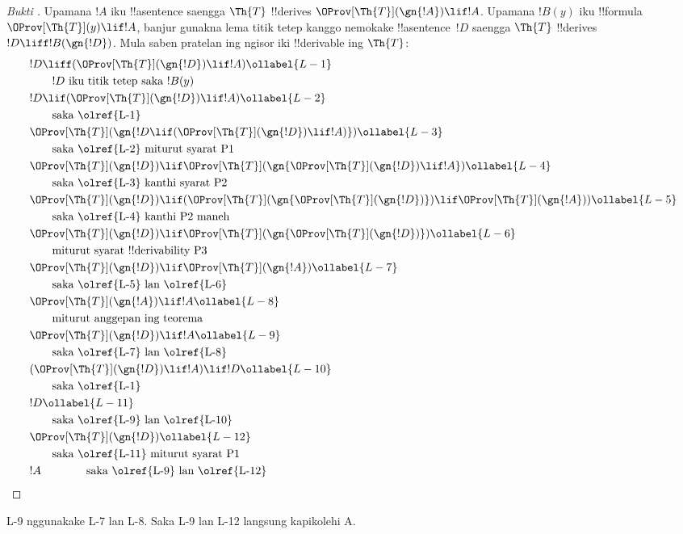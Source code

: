 \documentclass[../../../include/open-logic-section]{subfiles}
\begin{document}
\begin{proof}[Bukti ]
Upamana $!A$ iku !!a{sentence} saengga $\Th{T}$ !!{derive}s
$\OProv[\Th{T}](\gn{!A}) \lif !A$. Upamana $!B(y)$ iku
!!{formula}~$\OProv[\Th{T}](y) \lif !A$, banjur gunakna lema titik
tetep kanggo nemokake !!a{sentence}~$!D$ saengga $\Th{T}$
!!{derive}s $!D \liff !B(\gn{!D})$. Mula saben pratelan ing
ngisor iki !!{derivable} ing $\Th{T}$:
\begin{align}
  & !D \liff (\OProv[\Th{T}](\gn{!D}) \lif !A) \ollabel{L-1}\\
  & \qquad \text{$!D$ iku titik tetep saka~$!B(y)$}\notag \\
  & !D \lif (\OProv[\Th{T}](\gn{!D}) \lif !A) \ollabel{L-2}\\
  & \qquad\text{saka \olref{L-1}}\notag\\
  & \OProv[\Th{T}](\gn{!D \lif (\OProv[\Th{T}](\gn{!D}) \lif !A)}) \ollabel{L-3}\\
  & \qquad \text{saka \olref{L-2} miturut syarat P1}\notag \\
  & \OProv[\Th{T}](\gn{!D}) \lif \OProv[\Th{T}](\gn{\OProv[\Th{T}](\gn{!D}) \lif !A})
  \ollabel{L-4}\\
  &\qquad \text{saka \olref{L-3} kanthi syarat P2}\notag \\
  & \OProv[\Th{T}](\gn{!D}) \lif (\OProv[\Th{T}](\gn{\OProv[\Th{T}](\gn{!D})}) \lif \OProv[\Th{T}](\gn{!A})) \ollabel{L-5}\\
  &\qquad \text{saka \olref{L-4} kanthi P2 maneh} \notag\\
& \OProv[\Th{T}](\gn{!D}) \lif \OProv[\Th{T}](\gn{\OProv[\Th{T}](\gn{!D})}) \ollabel{L-6}\\
  & \qquad\text{miturut syarat !!{derivability} P3} \notag\\
  & \OProv[\Th{T}](\gn{!D}) \lif \OProv[\Th{T}](\gn{!A}) \ollabel{L-7} \\
  &\qquad\text{saka \olref{L-5} lan \olref{L-6}}\notag\\
  & \OProv[\Th{T}](\gn{!A}) \lif !A \ollabel{L-8}\\
  &\qquad\text{miturut anggepan ing teorema} \notag\\
  & \OProv[\Th{T}](\gn{!D}) \lif !A \ollabel{L-9}\\
  &\qquad\text{saka \olref{L-7} lan \olref{L-8}}\notag\\
  & (\OProv[\Th{T}](\gn{!D}) \lif !A) \lif !D \ollabel{L-10}\\
  & \qquad \text{saka \olref{L-1}}\notag \\
  & !D \ollabel{L-11}\\
  & \qquad\text{saka \olref{L-9} lan \olref{L-10}}\notag \\
  & \OProv[\Th{T}](\gn{!D}) \ollabel{L-12}\\
  & \qquad\text{saka \olref{L-11} miturut syarat~P1}\notag \\
  & !A \qquad\qquad\text{saka \olref{L-9} lan \olref{L-12}}\notag
\end{align}
\end{proof}
L-9 nggunakake L-7 lan L-8. Saka L-9 lan L-12 langsung kapikolehi A.
\end{document}
